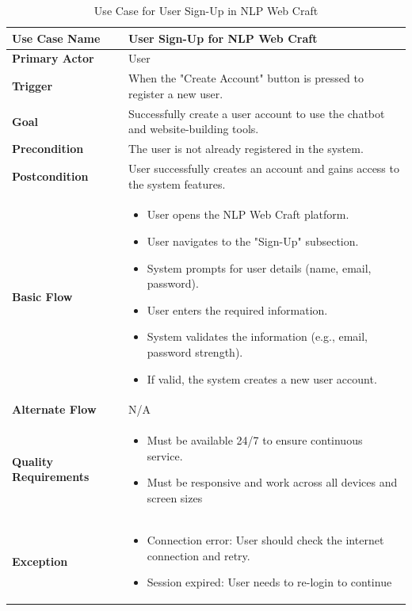 \documentclass[12pt]{report}
\begin{document}
\begin{table}[h!]

\begin{tabular}{|p{3.5cm}|p{10cm}|} %
\hline
\textbf{Use Case Name} & User Sign-Up for NLP Web Craft \\ 
\hline
\textbf{Primary Actor} & User \\ 
\hline
\textbf{Trigger} & When the "Create Account" button is pressed to register a new user. \\ 
\hline
\textbf{Goal} & Successfully create a user account to use the chatbot and website-building tools. \\ 
\hline
\textbf{Precondition} & The user is not already registered in the system. \\ 
\hline
\textbf{Postcondition} & User successfully creates an account and gains access to the system features. \\ 
\hline

\textbf{Basic Flow} & 
\begin{itemize}
    \item User opens the NLP Web Craft platform.
    \item User navigates to the "Sign-Up" subsection.
    \item System prompts for user details (name, email, password).
    \item User enters the required information.
    \item System validates the information (e.g., email, password strength).
    \item If valid, the system creates a new user account.
\end{itemize} \\ 
\hline
\textbf{Alternate Flow} & N/A \\ 
\hline
\textbf{Quality Requirements} & 
\begin{itemize}
    \item Must be available 24/7 to ensure continuous service.
    \item Must be responsive and work across all devices and screen sizes
\end{itemize} \\ 
\hline
\textbf{Exception} & 
\begin{itemize}
    \item Connection error: User should check the internet connection and retry.
    \item Session expired: User needs to re-login to continue
\end{itemize} \\ 
\hline
\end{tabular}

\caption{Use Case for User Sign-Up in NLP Web Craft} %
\end{table}
\end{document}
